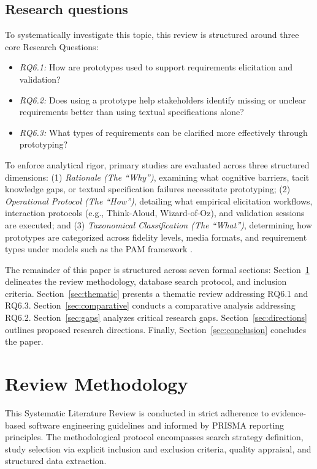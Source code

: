\documentclass[conference]{IEEEtran}
\begin{document}
\subsection{Research questions}
To systematically investigate this topic, this review is structured around three core Research Questions:
\begin{itemize}
    \item \textit{RQ6.1:} How are prototypes used to support requirements elicitation and validation?
    \item \textit{RQ6.2:} Does using a prototype help stakeholders identify missing or unclear requirements better than using textual specifications alone?
    \item \textit{RQ6.3:} What types of requirements can be clarified more effectively through prototyping?
\end{itemize}

To enforce analytical rigor, primary studies are evaluated across three structured dimensions: (1) \textit{Rationale (The ``Why'')}, examining what cognitive barriers, tacit knowledge gaps, or textual specification failures necessitate prototyping; (2) \textit{Operational Protocol (The ``How'')}, detailing what empirical elicitation workflows, interaction protocols (e.g., Think-Aloud, Wizard-of-Oz), and validation sessions are executed; and (3) \textit{Taxonomical Classification (The ``What'')}, determining how prototypes are categorized across fidelity levels, media formats, and requirement types under models such as the PAM framework \cite{bjarnason2023empirically}.

The remainder of this paper is structured across seven formal sections: Section~\ref{sec:methodology} delineates the review methodology, database search protocol, and inclusion criteria. Section~\ref{sec:thematic} presents a thematic review addressing RQ6.1 and RQ6.3. Section~\ref{sec:comparative} conducts a comparative analysis addressing RQ6.2. Section~\ref{sec:gaps} analyzes critical research gaps. Section~\ref{sec:directions} outlines proposed research directions. Finally, Section~\ref{sec:conclusion} concludes the paper.

\section{Review Methodology}
\label{sec:methodology}

This Systematic Literature Review is conducted in strict adherence to evidence-based software engineering guidelines and informed by PRISMA reporting principles. The methodological protocol encompasses search strategy definition, study selection via explicit inclusion and exclusion criteria, quality appraisal, and structured data extraction.
\end{document}
